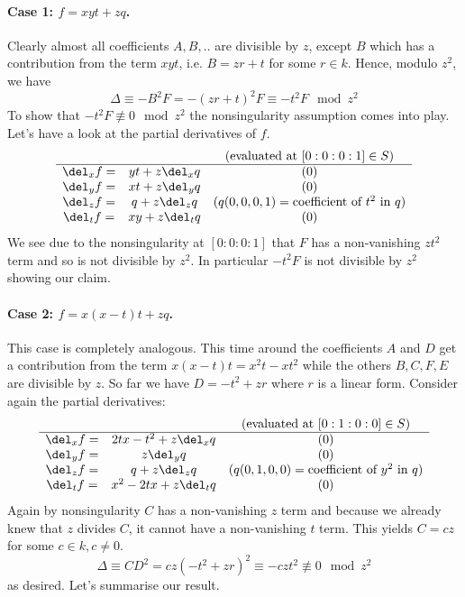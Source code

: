 \paragraph{Case 1: $f = xyt + zq$.} 
Clearly almost all coefficients $A,B,..$ are divisible by $z$, except $B$ which has a contribution from the term $xyt$, i.e. $B = zr + t$ for some $r\in k$.
Hence, modulo $z^2$, we have
\begin{equation}
\Delta \equiv -B^2F = -(zr+t)^2F \equiv -t^2F \mod z^2
\end{equation}
To show that $-t^2F \not\equiv 0 \mod z^2$ the nonsingularity assumption comes into play.
Let's have a look at the partial derivatives of $f$.
\begin{equation}
\begin{matrix}
         &  & \text{(evaluated at $[0:0:0:1] \in S$)} \\
\hline
\del_x f =& yt + z\del_x q & (0) \\
\del_y f =& xt + z\del_y q & (0) \\
\del_z f =& q + z\del_z q & (q(0,0,0,1) = \text{coefficient of $t^2$ in $q$}) \\
\del_t f =& xy + z\del_t q & (0)
\end{matrix}
\end{equation}
We see due to the nonsingularity at $[0:0:0:1]$ that $F$ has a non-vanishing $zt^2$ term and so is not divisible by $z^2$.
In particular $-t^2F$ is not divisible by $z^2$ showing our claim.

\paragraph{Case 2: $f = x(x-t)t + zq$.}
This case is completely analogous.
This time around the coefficients $A$ and $D$ get a contribution from the term $x(x-t)t = x^2t - xt^2$ while the others $B,C,F,E$ are divisible by $z$.
So far we have $D = -t^2 + zr$ where $r$ is a linear form.
Consider again the partial derivatives:
\begin{equation}
\begin{matrix}
         &  & \text{(evaluated at $[0:1:0:0] \in S$)} \\
\hline
\del_x f =& 2tx - t^2 + z\del_x q & (0) \\
\del_y f =& z\del_y q & (0) \\
\del_z f =& q + z\del_z q & (q(0,1,0,0) = \text{coefficient of $y^2$ in $q$}) \\
\del_t f =& x^2 - 2tx + z\del_t q & (0)
\end{matrix}
\end{equation}
Again by nonsingularity $C$ has a non-vanishing $z$ term and because we already knew that $z$ divides $C$, it cannot have a non-vanishing $t$ term.
This yields $C = cz$ for some $c\in k, c \neq 0$.
\begin{equation}
\Delta \equiv CD^2 = cz(-t^2+zr)^2 \equiv -czt^2  \not\equiv 0 \mod z^2
\end{equation}
as desired. Let's summarise our result.

